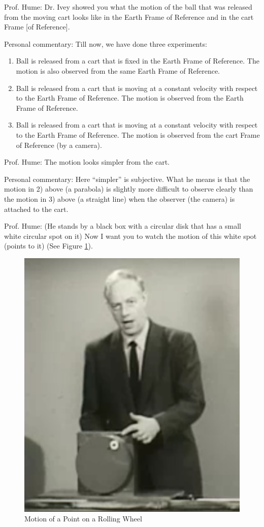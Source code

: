 \documentclass[a6paper]{article}
\begin{document}
Prof. Hume: Dr. Ivey showed you what the motion of the ball that was released from the moving cart looks like in the Earth Frame of Reference and in the cart Frame [of Reference].

Personal commentary: Till now, we have done three experiments:
\begin{enumerate}
    \item \label{item: exp1} Ball is released from a cart that is fixed in the Earth Frame of Reference. The motion is also observed from the same Earth Frame of Reference.
    \item \label{item: exp2} Ball is released from a cart that is moving at a constant velocity with respect to the Earth Frame of Reference. The motion is observed from the Earth Frame of Reference.
    \item \label{item: exp3} Ball is released from a cart that is moving at a constant velocity with respect to the Earth Frame of Reference. The motion is observed from the cart Frame of Reference (by a camera).
\end{enumerate}

Prof. Hume: The motion looks simpler from the cart. 

Personal commentary: Here ``simpler'' is subjective. What he means is that the motion in 2) above (a parabola) is slightly more difficult to observe clearly than the motion in 3) above (a straight line) when the observer (the camera) is attached to the cart.

Prof. Hume: (He stands by a black box with a circular disk that has a small white circular spot on it) Now I want you to watch the motion of this white spot (points to it) (See Figure \ref{fig: prof-hume-cycloid-1}).
        \begin{figure}[h!]
            \centering
            \includegraphics[width=0.7\linewidth]{prof-hume-cycloid-1.png}
            \caption{Motion of a Point on a Rolling Wheel}
            \label{fig: prof-hume-cycloid-1}
        \end{figure}
\end{document}

